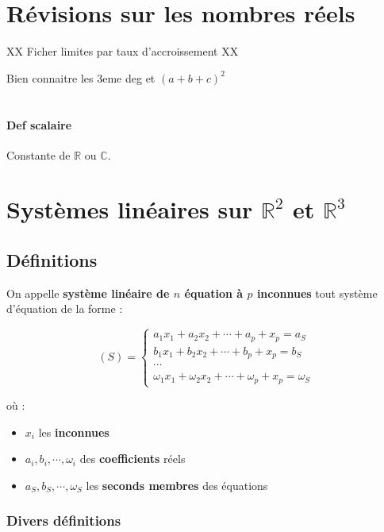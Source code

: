 \documentclass{report}
\newcommand{\R}{\mathbb{R}}
\begin{document}
\newpage

\setcounter{section}{0}

\section{Révisions sur les nombres réels}

XX Ficher limites par taux d'accroissement XX

Bien connaitre les  3eme deg et $(a+b+c)^2$ \\~\\

\paragraph{Def scalaire} Constante de $\R$ ou $\mathbb{C}$.


\newpage


\section{Systèmes linéaires sur $\R^2$ et $\R^3$}

  \subsection{Définitions}

    On appelle \textbf{système linéaire de $n$ équation à $p$ inconnues} tout système d'équation de la forme : 

    \[(S) = \left\{\begin{array}{c}
      a_1x_1+a_2x_2+\cdots+a_p+x_p = a_S \\
      b_1x_1+b_2x_2+\cdots+b_p+x_p = b_S \\
      \cdots \\
      \omega_1x_1+\omega_2x_2+\cdots+\omega_p+x_p = \omega_S
    \end{array}\right.\]

    où : 
    \begin{itemize}
      \item $x_i$ les \textbf{inconnues}
      \item $a_i, b_i, \cdots, \omega_i$ des \textbf{coefficients} réels
      \item $a_S, b_S, \cdots, \omega_S$ les \textbf{seconds membres} des équations
    \end{itemize}

    \subsubsection*{Divers définitions}
\end{document}
